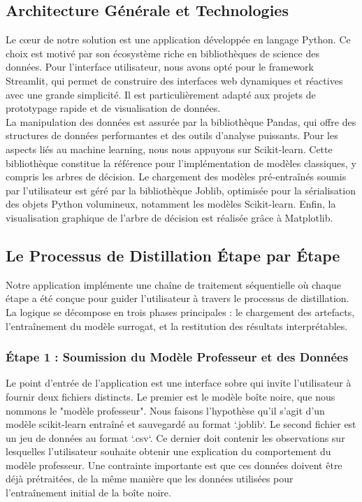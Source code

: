 \documentclass{article}
\begin{document}
\subsection{Architecture Générale et Technologies}

\quad Le cœur de notre solution est une application développée en langage Python. Ce choix est motivé par son écosystème riche en bibliothèques de science des données. Pour l'interface utilisateur, nous avons opté pour le framework Streamlit, qui permet de construire des interfaces web dynamiques et réactives avec une grande simplicité. Il est particulièrement adapté aux projets de prototypage rapide et de visualisation de données.\\

La manipulation des données est assurée par la bibliothèque Pandas, qui offre des structures de données performantes et des outils d'analyse puissants. Pour les aspects liés au machine learning, nous nous appuyons sur Scikit-learn. Cette bibliothèque constitue la référence pour l'implémentation de modèles classiques, y compris les arbres de décision. Le chargement des modèles pré-entraînés soumis par l'utilisateur est géré par la bibliothèque Joblib, optimisée pour la sérialisation des objets Python volumineux, notamment les modèles Scikit-learn. Enfin, la visualisation graphique de l'arbre de décision est réalisée grâce à Matplotlib.

\subsection{Le Processus de Distillation Étape par Étape}

\quad Notre application implémente une chaîne de traitement séquentielle où chaque étape a été conçue pour guider l'utilisateur à travers le processus de distillation. La logique se décompose en trois phases principales : le chargement des artefacts, l'entraînement du modèle surrogat, et la restitution des résultats interprétables.

    \subsubsection{Étape 1 : Soumission du Modèle Professeur et des Données}

    \quad Le point d'entrée de l'application est une interface sobre qui invite l'utilisateur à fournir deux fichiers distincts. Le premier est le modèle boîte noire, que nous nommons le "modèle professeur". Nous faisons l'hypothèse qu'il s'agit d'un modèle scikit-learn entraîné et sauvegardé au format `.joblib`. Le second fichier est un jeu de données au format `.csv`. Ce dernier doit contenir les observations sur lesquelles l'utilisateur souhaite obtenir une explication du comportement du modèle professeur. Une contrainte importante est que ces données doivent être déjà prétraitées, de la même manière que les données utilisées pour l'entraînement initial de la boîte noire.
    
\end{document}
